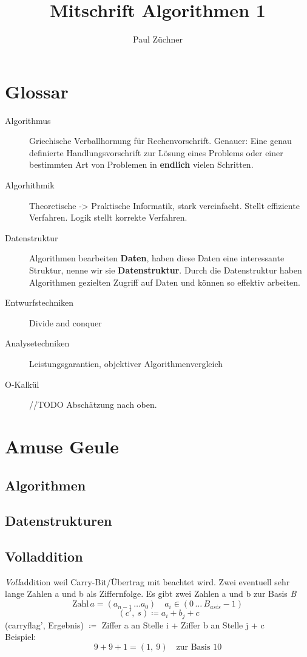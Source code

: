 \documentclass[a4paper]{scrartcl}
\title{Mitschrift Algorithmen 1}
\author{Paul Züchner}
\begin{document}
\maketitle

\tableofcontents

\newpage
\section{Glossar}
\begin{description}  
	\item[Algorithmus] 
		Griechische Verballhornung für Rechenvorschrift. Genauer: Eine genau definierte Handlungsvorschrift zur Lösung eines Problems oder einer bestimmten Art von Problemen in \textbf{endlich} vielen Schritten.
	
	\item[Algorhithmik] 
		Theoretische -> Praktische Informatik, stark vereinfacht. Stellt effiziente Verfahren. Logik stellt korrekte Verfahren. 
	
	\item[Datenstruktur] 
		Algorithmen bearbeiten \textbf{Daten}, haben diese Daten eine interessante Struktur, nenne wir sie \textbf{Datenstruktur}. Durch die Datenstruktur haben Algorithmen gezielten Zugriff auf Daten und können so effektiv arbeiten.
	
	\item[Entwurfstechniken] 
		Divide and conquer
	
	\item[Analysetechniken] 
		Leistungsgarantien, objektiver Algorithmenvergleich
	
	\item[O-Kalkül] 
		//TODO Abschätzung nach oben.
\end{description}

\section{Amuse Geule}
	\subsection{Algorithmen}
	\subsection{Datenstrukturen}
	
	\subsection{Volladdition}
		\emph{Voll}addition weil Carry-Bit/Übertrag mit beachtet wird. Zwei eventuell sehr lange Zahlen a und b als Ziffernfolge. Es gibt zwei Zahlen a und b zur Basis \emph{B} 
		 \[ \text{Zahl} \, a = (a_{n-1} \, \dots a_0) \quad a_i \in (0 \, \dots \, B_{asis} - 1) \]
	 	\[\ (c', \: s ) \coloneqq  a_i + b_j + c\] 
	 	(carryflag', Ergebnis) \( \coloneqq \) Ziffer a an Stelle i + Ziffer b an Stelle j + c\\
	 	Beispiel: 
	 	\[9 + 9 +1 = (1, \: 9) \quad \text{zur Basis 10}\]
	 		
\end{document}
